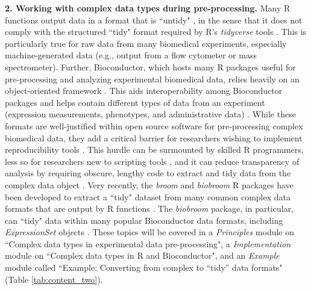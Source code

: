 \documentclass[pdftex,english,11.5pt,parskip=half]{scrartcl}
\begin{document}
\textbf{2. Working with complex data types during pre-processing.} Many R functions output data in a format that is ``untidy" \cite{robinson2014broom}, in the sense that it does not comply with the structured ``tidy" format required by R's \textit{tidyverse} tools \cite{wickham2014tidy}. This is particularly true for raw data from many biomedical experiments, especially machine-generated data (e.g., output from a flow cytometer or mass spectrometer). Further, Bioconductor, which hosts many R packages useful for pre-processing and analyzing experimental biomedical data, relies heavily on an object-oriented framework \cite{gentleman2004bioconductor}.  This aids interoperability among Bioconductor packages and helps contain different types of data from an experiment (expression measurements, phenotypes, and administrative data) \cite{gentleman2004bioconductor}. While these formats are well-justified within open source software for pre-processing complex biomedical data, they add a critical barrier for researchers wishing
to implement reproducibility tools \cite{robinson2014broom}. This hurdle can be surmounted by skilled R programmers, less so for researchers new to scripting tools \cite{robinson2014broom}, and it can reduce transparency of analysis by requiring obscure, lengthy code to extract and tidy data from the complex data object \cite{robinson2014broom}. Very recently, the \textit{broom} and \textit{biobroom} R packages have been developed 
to extract a ``tidy" dataset from many common complex data formats that are output by R functions \cite{robinson2014broom, biobroom}.
The \textit{biobroom} package, in particular, can ``tidy" data within many popular Bioconductor data formats, including \textit{ExpressionSet} objects \cite{biobroom}. These topics will be covered in a \textit{Principles} module on ``Complex data types in
experimental data pre-processing", a \textit{Implementation} module on ``Complex
data types in R and Bioconductor", and an \textit{Example} module called
``Example: Converting from complex to ``tidy'' data formats" (Table \ref*{tab:content_two}).
\end{document}

